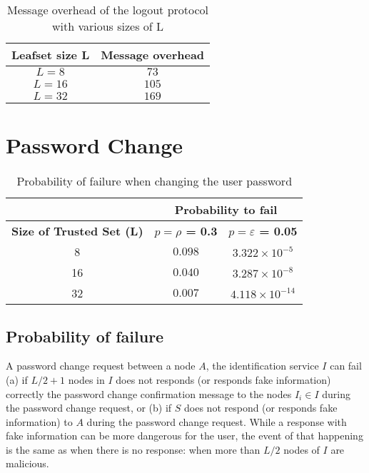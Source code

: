 
\begin{table}
  \centering
  \footnotesize
  \begin{tabular}{|c|c|}
    \hline
     \textbf{Leafset size L} & \textbf{Message overhead}\\
    \hline
      $L = 8$ & $73$\\
    \hline
      $L = 16$ & $105$\\
    \hline
      $L = 32$ & $169$\\
    \hline
  \end{tabular}
  \caption{Message overhead of the logout protocol with various sizes of L}
  \label{tab:logout_messages}
\end{table}

\section{Password Change}
  \label{sec:eval_password_change}
  \begin{table}
    \centering
    \footnotesize
    \begin{tabular}{|c|c|c|}
      \cline{2-3}
      \multicolumn{1}{c|}{}&  \multicolumn{2}{c|}{\textbf{Probability to fail}} \\ \cline{2-3}
      \hline
      \textbf{Size of Trusted Set (L)} & \textbf{$p = \rho$ = 0.3} &  \textbf{$p = \varepsilon$ = 0.05}  \\
      \hline \hline
      8 &  $0.098$ & $3.322 \times 10^{-5}$ \\
      \hline
      16 & $0.040$ & $3.287 \times 10^{-8}$  \\
      \hline
      32 & $0.007$ & $4.118 \times 10^{-14}$  \\
      \hline
    \end{tabular}
    \caption{Probability of failure when changing the user password}
    \label{tab:p_password_change}
  \end{table}
  
  \subsection{Probability of failure}
    A password change request between a node $A$, the identification service
$I$ can fail (a) if $L/2 + 1$ nodes in $I$ does not responds (or responds fake
information) correctly the password change confirmation message to the nodes 
$I_i \in I$ during the password change request, or (b) if $S$ does not respond (or responds fake information) to $A$
during the password change request. While a response with fake information can be more dangerous for the
user, the event of that happening is the same as when there is no response:
when more than $L/2$ nodes of $I$ are malicious.

